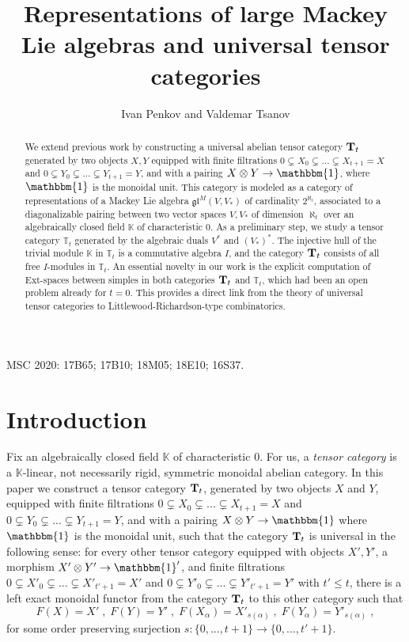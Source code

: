 \documentclass[12pt]{article}
\def\KK {{\mathbb K}}     %
\def\TT {{\mathbb T}}     %
\def\mk {\mathfrak}
\begin{document}
\title{Representations of large Mackey Lie algebras and universal tensor categories}
\author{Ivan Penkov and Valdemar Tsanov}

\maketitle



\begin{abstract}
We extend previous work by constructing a universal abelian tensor category ${\bf T}_t$ generated by two objects $X,Y$ equipped with finite filtrations $0\subsetneq X_0\subsetneq ...\subsetneq X_{t+1}= X$ and $0\subsetneq Y_0\subsetneq ... \subsetneq Y_{t+1}= Y$, and with a pairing $X\otimes Y\to \mathbbm{1}$, where $\mathbbm{1}$ is the monoidal unit. This category is modeled as a category of representations of a Mackey Lie algebra $\mk{gl}^M(V,V_*)$ of cardinality $2^{\aleph_t}$, associated to a diagonalizable pairing between two vector spaces $V,V_*$ of dimension $\aleph_t$ over an algebraically closed field $\KK$ of characteristic $0$. As a preliminary step, we study a tensor category $\TT_t$ generated by the algebraic duals $V^*$ and $(V_*)^*$. The injective hull of the trivial module $\KK$ in $\TT_t$ is a commutative algebra $I$, and the category ${\bf T}_t$ consists of all free $I$-modules in $\TT_t$. An essential novelty in our work is the explicit computation of Ext-spaces between simples in both categories ${\bf T}_t$ and $\TT_t$, which had been an open problem already for $t=0$. This provides a direct link from the theory of universal tensor categories to Littlewood-Richardson-type combinatorics.
\end{abstract}

MSC 2020: 17B65; 17B10; 18M05; 18E10; 16S37.


\section{Introduction}


Fix an algebraically closed field $\KK$ of characteristic $0$. For us, a {\it tensor category} is a $\KK$-linear, not necessarily rigid, symmetric monoidal abelian category. In this paper we construct a tensor category ${\bf T}_t$, generated by two objects $X$ and $Y$, equipped with finite filtrations $0\subsetneq X_0\subsetneq ...\subsetneq X_{t+1}=X$ and $0\subsetneq Y_0\subsetneq ... \subsetneq Y_{t+1}= Y$, and with a pairing $X\otimes Y\to \mathbbm{1}$ where $\mathbbm{1}$ is the monoidal unit, such that the category ${\bf T}_t$ is universal in the following sense: for every other tensor category equipped with objects $X',Y'$, a morphism $X'\otimes Y'\to\mathbbm{1}'$, and finite filtrations $0\subsetneq X'_0\subsetneq ... \subsetneq X'_{t'+1}= X'$ and $0\subsetneq Y'_0\subsetneq ...\subsetneq Y'_{t'+1}= Y'$ with $t'\leq t$, there is a left exact monoidal functor from the category ${\bf T}_t$ to this other category such that
$$
F(X)=X'\;,\; F(Y)=Y'\;,\; F(X_\alpha)=X'_{s(\alpha)} \;,\; F(Y_\alpha)=Y'_{s(\alpha)} \;,
$$
for some order preserving surjection $s:\{0,...,t+1\}\to\{0,...,t'+1\}$. 
\end{document}
